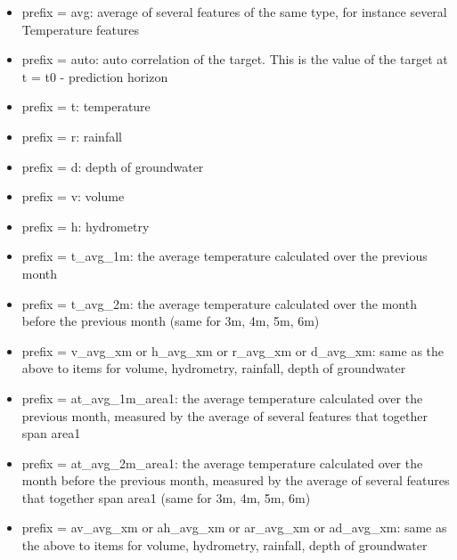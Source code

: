 \documentclass{article}
\begin{document}
\begin{itemize}
\item prefix = avg: average of several features of the same type, for instance several Temperature features
\item prefix = auto: auto correlation of the target. This is the value of the target at t = t0 - prediction horizon
\item prefix = t: temperature
\item prefix = r: rainfall
\item prefix = d: depth of groundwater
\item prefix = v: volume
\item prefix = h: hydrometry
\item prefix = t\_avg\_1m: the average temperature calculated over the previous month   
\item prefix = t\_avg\_2m: the average temperature calculated over the month before the previous month (same for 3m, 4m, 5m, 6m)
\item prefix = v\_avg\_xm or h\_avg\_xm or r\_avg\_xm or d\_avg\_xm: same as the above to items for volume, hydrometry, rainfall, depth of groundwater
\item prefix = at\_avg\_1m\_area1: the average temperature calculated over the previous month, measured by the average of several features that together span area1  
\item prefix = at\_avg\_2m\_area1: the average temperature calculated over the month before the previous month, measured by the average of several features that together span area1 (same for 3m, 4m, 5m, 6m) 
\item prefix = av\_avg\_xm or ah\_avg\_xm or ar\_avg\_xm or ad\_avg\_xm: same as the above to items for volume, hydrometry, rainfall, depth of groundwater
\end{itemize}
\end{document}
